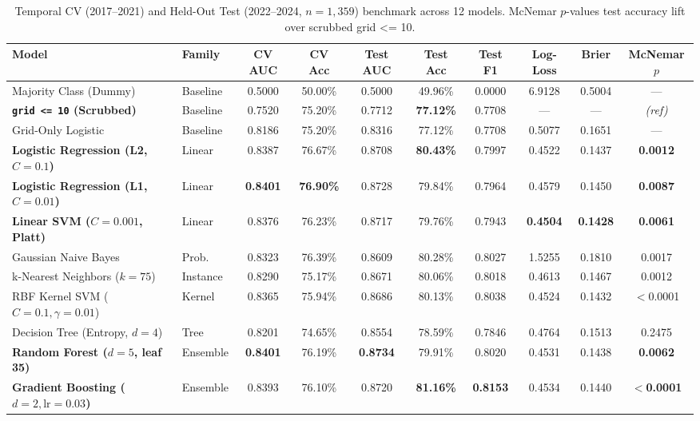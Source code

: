 \documentclass[10pt,a4paper,twocolumn]{article}
\newcommand{\code}[1]{{\fontsize{8.5pt}{10pt}\selectfont\ttfamily #1}}
\begin{document}
\begin{table}[t]
  \centering
  \caption{Temporal CV (2017--2021) and Held-Out Test (2022--2024, $n=1{,}359$) benchmark across 12 models. McNemar $p$-values test accuracy lift over scrubbed \code{grid <= 10}.}
  \label{tab:bench}
  {\scriptsize
  \setlength{\tabcolsep}{4.6pt}
  \renewcommand{\arraystretch}{1.14}
  \begin{tabularx}{\textwidth}{L l c c c c c c c c}
    \toprule
    \textbf{Model} & \textbf{Family} & \textbf{CV AUC} & \textbf{CV Acc} & \textbf{Test AUC} & \textbf{Test Acc} & \textbf{Test F1} & \textbf{Log-Loss} & \textbf{Brier} & \textbf{McNemar $p$} \\
    \midrule
    Majority Class (Dummy) & Baseline & 0.5000 & 50.00\% & 0.5000 & 49.96\% & 0.0000 & 6.9128 & 0.5004 & --- \\
    \textbf{\texttt{grid <= 10} (Scrubbed)} & Baseline & 0.7520 & 75.20\% & 0.7712 & \textbf{77.12\%} & 0.7708 & --- & --- & \textit{(ref)} \\
    Grid-Only Logistic & Baseline & 0.8186 & 75.20\% & 0.8316 & 77.12\% & 0.7708 & 0.5077 & 0.1651 & --- \\
    \midrule
    \textbf{Logistic Regression (L2, $C=0.1$)} & Linear & 0.8387 & 76.67\% & 0.8708 & \textbf{80.43\%} & 0.7997 & 0.4522 & 0.1437 & \textbf{0.0012} \\
    \textbf{Logistic Regression (L1, $C=0.01$)} & Linear & \textbf{0.8401} & \textbf{76.90\%} & 0.8728 & 79.84\% & 0.7964 & 0.4579 & 0.1450 & \textbf{0.0087} \\
    \textbf{Linear SVM ($C=0.001$, Platt)} & Linear & 0.8376 & 76.23\% & 0.8717 & 79.76\% & 0.7943 & \textbf{0.4504} & \textbf{0.1428} & \textbf{0.0061} \\
    Gaussian Naive Bayes & Prob. & 0.8323 & 76.39\% & 0.8609 & 80.28\% & 0.8027 & 1.5255 & 0.1810 & 0.0017 \\
    k-Nearest Neighbors ($k=75$) & Instance & 0.8290 & 75.17\% & 0.8671 & 80.06\% & 0.8018 & 0.4613 & 0.1467 & 0.0012 \\
    RBF Kernel SVM ($C=0.1, \gamma=0.01$) & Kernel & 0.8365 & 75.94\% & 0.8686 & 80.13\% & 0.8038 & 0.4524 & 0.1432 & $<$0.0001 \\
    Decision Tree (Entropy, $d=4$) & Tree & 0.8201 & 74.65\% & 0.8554 & 78.59\% & 0.7846 & 0.4764 & 0.1513 & 0.2475 \\
    \textbf{Random Forest ($d=5$, leaf 35)} & Ensemble & \textbf{0.8401} & 76.19\% & \textbf{0.8734} & 79.91\% & 0.8020 & 0.4531 & 0.1438 & \textbf{0.0062} \\
    \textbf{Gradient Boosting ($d=2, \text{lr}=0.03$)} & Ensemble & 0.8393 & 76.10\% & 0.8720 & \textbf{81.16\%} & \textbf{0.8153} & 0.4534 & 0.1440 & \textbf{$<$0.0001} \\
    \bottomrule
  \end{tabularx}}
\end{table}
\end{document}
